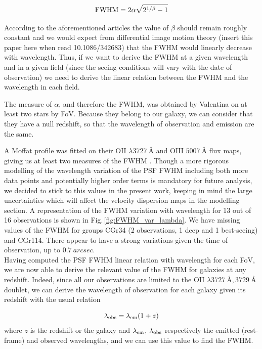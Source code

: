 \begin{equation}
	\rm{FWHM} = 2 \alpha \sqrt{2^{1/\beta} - 1 }
\end{equation}

According to the aforementioned articles the value of $\beta$ should remain roughly constant and we would expect from differential image motion theory (insert this paper here when read 10.1086/342683) that the FWHM  would linearly decrease with wavelength. Thus, if we want to derive the FWHM at a given wavelength and in a given field (since the seeing conditions will vary with the date of observation) we need to derive the linear relation between the FWHM and the wavelength in each field.

The measure of $\alpha$, and therefore the FWHM, was obtained by Valentina on at least two stars by FoV. Because they belong to our galaxy, we can consider that they have a null redshift, so that the wavelength of observation and emission are the same.

 A Moffat profile was fitted on their OII $\lambda \SI{3727}{\angstrom}$ and OIII $\SI{5007}{\angstrom}$ flux maps, giving us at least two measures of the FWHM . Though a more rigorous modelling of the wavelength variation of the PSF FWHM including both more data points and potentially higher order terms is mandatory for future analysis, we decided to stick to this values in the present work, keeping in mind the large uncertainties which will affect the velocity dispersion maps in the modelling section. A representation of the FWHM variation with wavelength for 13 out of 16 observations is shown in Fig.\,\ref{fig:FWHM_var_lambda}. We have missing values of the FWHM for groups CGr34 (2 observations, 1 deep and 1 best-seeing) and CGr114. There appear to have a strong variations given the time of observation, up to $\SI{0.7}{arcsec}$. \\
 
Having computed the PSF FWHM  linear relation with wavelength for each FoV, we are now able to derive the relevant value of the FWHM for galaxies at any redshift. Indeed, since all our observations are limited to the OII $\lambda \SI{3727}{\angstrom}, \SI{3729}{\angstrom}$ doublet, we can derive the wavelength of observation for each galaxy given its redshift with the usual relation

\begin{equation}
	\lambda_{\rm{obs}} = \lambda_{\rm{em}} ( 1 + z )
\end{equation}
where $z$ is the redshift or the galaxy and $\lambda_{\rm{em}}$, $\lambda_{\rm{obs}}$ respectively the emitted (rest-frame) and observed wavelengths, and we can use this value to find the FWHM.\\

